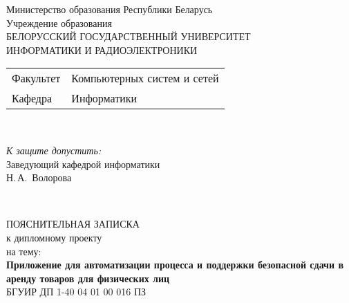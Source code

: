 

\begin{titlepage}
  \begin{center}
    Министерство образования Республики Беларусь\\[1em]
    Учреждение образования\\
    БЕЛОРУССКИЙ ГОСУДАРСТВЕННЫЙ УНИВЕРСИТЕТ \\
    ИНФОРМАТИКИ И РАДИОЭЛЕКТРОНИКИ\\[1em]

    \begin{minipage}{\textwidth}
      \begin{flushleft}
        \begin{tabular}{ l l }
          Факультет & Компьютерных систем и сетей\\
          Кафедра   & Информатики
        \end{tabular}
      \end{flushleft}
    \end{minipage}\\[1em]

    \begin{flushright}
      \begin{minipage}{0.4\textwidth}
        \textit{К защите допустить:}\\[0.8em]
        Заведующий кафедрой информатики\\[0.45em]
        \underline{\hspace*{2.8cm}} Н.\,А.~Волорова
      \end{minipage}\\[2.2em]
    \end{flushright}

    {ПОЯСНИТЕЛЬНАЯ ЗАПИСКА}\\
    {к дипломному проекту}\\
    {на тему:}\\[1em]
    \textbf{\large Приложение для автоматизации процесса и поддержки безопасной сдачи в аренду товаров для физических лиц}\\[1em]


    {БГУИР ДП 1-40 04 01 00 016 ПЗ}\\[2em]


\end{center}
\end{titlepage}
